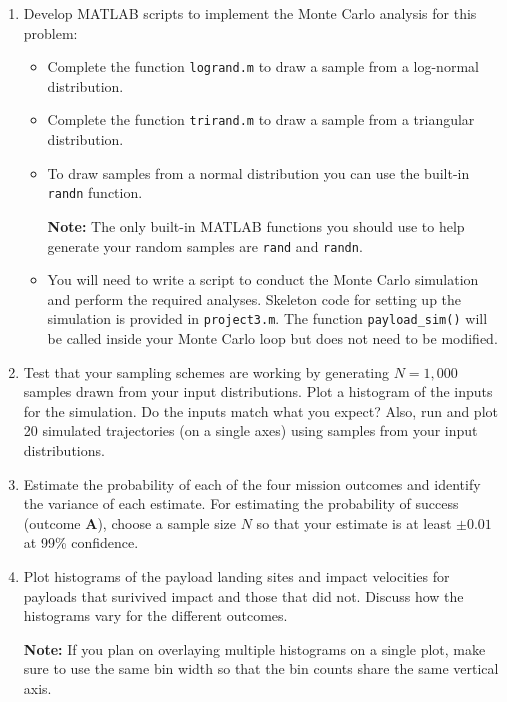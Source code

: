 \documentclass[11pt]{article}
\begin{document}
\begin{enumerate}
  \item Develop MATLAB scripts to implement the Monte Carlo analysis for this problem:
  \begin{itemize}
    \item Complete the function \texttt{logrand.m} to draw a sample from a log-normal distribution.
    \item Complete the function \texttt{trirand.m} to draw a sample from a triangular distribution.
    \item To draw samples from a normal distribution you can use the built-in \texttt{randn} function.

    \textbf{Note:} The only built-in MATLAB functions you should use to help generate your random samples are \texttt{rand} and \texttt{randn}.
    \item You will need to write a script to conduct the Monte Carlo simulation and perform the required analyses. Skeleton code for setting up the simulation is provided in \texttt{project3.m}. The function \texttt{payload\_sim()} will  be called inside your Monte Carlo loop but does not need to be modified.
  \end{itemize}
  \item Test that your sampling schemes are working by generating $N=1,000$ samples drawn from your input distributions. Plot a histogram of the inputs for the simulation. Do the inputs match what you expect? Also, run and plot 20 simulated trajectories (on a single axes) using samples from your input distributions.

  \item Estimate the probability of each of the four mission outcomes and identify the variance of each estimate. For estimating the probability of success (outcome \textbf{A}), choose a sample size $N$ so that your estimate is at least $\pm0.01$ at 99\% confidence.

  \item Plot histograms of the payload landing sites and impact velocities for payloads that surivived impact and those that did not. Discuss how the histograms vary for the different outcomes.

  \textbf{Note:} If you plan on overlaying multiple histograms on a single plot, make sure to use the same bin width so that the bin counts share the same vertical axis.
\end{enumerate}
\end{document}
